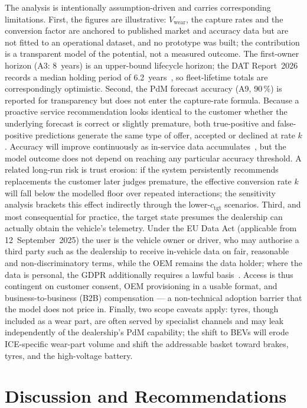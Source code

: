 \documentclass[conference,a4paper]{IEEEtran}
\newcommand{\cSoll}{c_{\mathrm{tgt}}}
\begin{document}
The analysis is intentionally assumption-driven and carries corresponding
limitations. First, the figures are illustrative: $V_{\mathrm{wear}}$, the capture
rates and the conversion factor are anchored to published market and accuracy
data but are not fitted to an operational dataset, and no prototype was built;
the contribution is a transparent model of the potential, not a measured
outcome. The first-owner horizon (A3: 8~years) is an upper-bound lifecycle horizon; the
DAT Report~2026 records a median holding period of 6.2~years~\cite{dat2026report},
so fleet-lifetime totals are correspondingly optimistic. Second, the PdM forecast accuracy (A9, 90\,\%) is reported for transparency
but does not enter the capture-rate formula. Because a proactive service
recommendation looks identical to the customer whether the underlying forecast
is correct or slightly premature, both true-positive and false-positive
predictions generate the same type of offer, accepted or declined at rate $k$.
Accuracy will improve continuously as in-service data accumulates~\cite{abougrad2026xai},
but the model outcome does not depend on reaching any particular accuracy threshold. A related long-run risk is trust erosion: if the system persistently recommends replacements the customer later judges premature, the effective conversion rate $k$ will fall below the modelled floor over repeated interactions; the sensitivity analysis brackets this effect indirectly through the lower-$\cSoll$ scenarios. Third, and most
consequential for practice, the target state presumes the dealership can actually
obtain the vehicle's telemetry. Under the EU Data Act (applicable from
12~September~2025) the user is the vehicle owner or driver, who may authorise a
third party such as the dealership to receive in-vehicle data on fair,
reasonable and non-discriminatory terms, while the OEM remains the data holder;
where the data is personal, the GDPR additionally requires a lawful basis~\cite{eu2023dataact}.
Access is thus contingent on customer consent, OEM provisioning in a usable
format, and business-to-business (B2B) compensation --- a non-technical adoption barrier that the model
does not price in. Finally, two scope caveats apply: tyres, though included as a
wear part, are often served by specialist channels and may leak independently of
the dealership's PdM capability; the shift to BEVs will erode ICE-specific wear-part volume and shift the addressable basket toward brakes, tyres, and the high-voltage battery.
\FloatBarrier
\section{Discussion and Recommendations}
\end{document}
